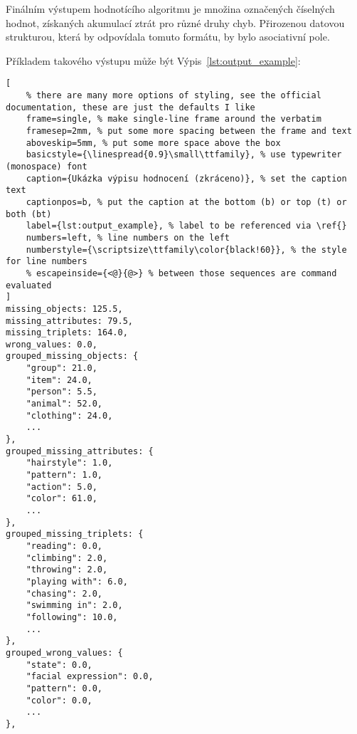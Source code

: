 Finálním výstupem hodnotícího algoritmu je množina označených číselných hodnot, získaných akumulací ztrát pro různé druhy chyb.
Přirozenou datovou strukturou, která by odpovídala tomuto formátu, by bylo asociativní pole.

Příkladem takového výstupu může být Výpis~\ref{lst:output_example}:
\begin{lstlisting}[
	% there are many more options of styling, see the official documentation, these are just the defaults I like
	frame=single, % make single-line frame around the verbatim
	framesep=2mm, % put some more spacing between the frame and text
	aboveskip=5mm, % put some more space above the box
	basicstyle={\linespread{0.9}\small\ttfamily}, % use typewriter (monospace) font
	caption={Ukázka výpisu hodnocení (zkráceno)}, % set the caption text
	captionpos=b, % put the caption at the bottom (b) or top (t) or both (bt)
	label={lst:output_example}, % label to be referenced via \ref{}
	numbers=left, % line numbers on the left
	numberstyle={\scriptsize\ttfamily\color{black!60}}, % the style for line numbers
	% escapeinside={<@}{@>} % between those sequences are command evaluated
]
missing_objects: 125.5,
missing_attributes: 79.5,
missing_triplets: 164.0,
wrong_values: 0.0,
grouped_missing_objects: {
    "group": 21.0,
    "item": 24.0,
    "person": 5.5,
    "animal": 52.0,
    "clothing": 24.0,
    ...
},
grouped_missing_attributes: {
    "hairstyle": 1.0,
    "pattern": 1.0,
    "action": 5.0,
    "color": 61.0,
    ...
},
grouped_missing_triplets: {
    "reading": 0.0,
    "climbing": 2.0,
    "throwing": 2.0,
    "playing with": 6.0,
    "chasing": 2.0,
    "swimming in": 2.0,
    "following": 10.0,
    ...
},
grouped_wrong_values: {
    "state": 0.0,
    "facial expression": 0.0,
    "pattern": 0.0,
    "color": 0.0,
    ...
},
\end{lstlisting}

